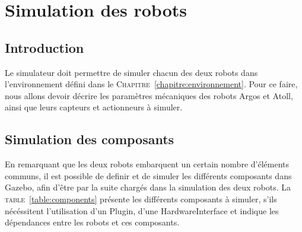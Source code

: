 \chapter{Simulation des robots}
	
	\section{Introduction}
		Le simulateur doit permettre de simuler chacun des deux robots dans l'environnement défini dans le \textsc{Chapitre}~\ref{chapitre:environnement}. Pour ce faire, nous allons devoir décrire les paramètres mécaniques des robots \gls{Argos} et \gls{Atoll}, ainsi que leurs capteurs et actionneurs à simuler.

	\section{Simulation des composants}
		En remarquant que les deux robots embarquent un certain nombre d'éléments communs, il est possible de definir et de simuler les différents composants dans \gls{Gazebo}, afin d'être par la suite chargés dans la simulation des deux robots. La \textsc{table}~\ref{table:components} présente les différents composants à simuler, s'ils nécéssitent l'utilisation d'un \gls{Plugin}, d'une \gls{HardwareInterface} et indique les dépendances entre les robots et ces composants.

